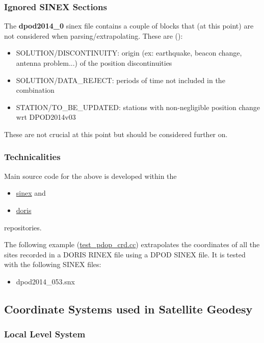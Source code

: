 \subsubsection{Ignored SINEX Sections}
The \textbf{dpod2014\_0} \gls{sinex} file contains a couple of blocks that (at 
this point) are not considered when parsing/extrapolating. These are 
(\cite{Moreaux2020}):
\begin{itemize}
    \item SOLUTION/DISCONTINUITY: origin (ex: earthquake, beacon change, antenna problem...) of
the position discontinuities
    \item SOLUTION/DATA\_REJECT: periods of time not included in the combination
    \item STATION/TO\_BE\_UPDATED: stations with non-negligible position change wrt DPOD2014v03
\end{itemize}

These are not crucial at this point but should be considered further on.

\subsubsection{Technicalities}

Main source code for the above is developed within the 
\begin{itemize}
    \item \href{https://github.com/xanthospap/libsinex}{sinex} and
    \item \href{https://github.com/xanthospap/doris}{doris}
\end{itemize}
repositories.


The following example (\href{https://github.com/xanthospap/doris/blob/main/test/test\_pdop\_crd.cc}{test\_pdop\_crd.cc}) 
extrapolates the coordinates of all the sites recorded in a DORIS RINEX file using a DPOD 
SINEX file. It is tested with the following SINEX files:
\begin{itemize}
    \item dpod2014\_053.snx
\end{itemize}


\subsection{Coordinate Systems used in Satellite Geodesy}
\label{ssec:coordinate-systems-in-satellite-geodesy}

\subsubsection{Local Level System}
\label{sssec:local-level-system}

